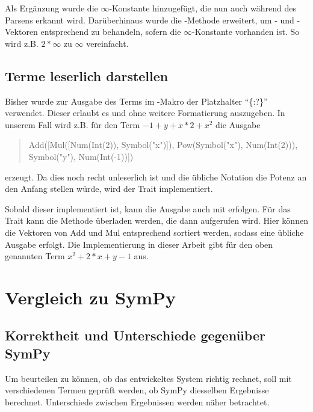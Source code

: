 \documentclass[11pt,a4paper, ngerman]{article}
\begin{document}
Als Ergänzung wurde die $\infty$-Konstante hinzugefügt, die nun auch während des Parsens erkannt wird. Darüberhinaus wurde die -Methode erweitert, um - und -Vektoren entsprechend zu behandeln, sofern die $\infty$-Konstante vorhanden ist. So wird z.B. $2*\infty$ zu $\infty$ vereinfacht.

\subsection{Terme leserlich darstellen}
Bisher wurde zur Ausgabe des Terms im -Makro der Platzhalter ``\{:?\}'' verwendet. Dieser erlaubt es  und  ohne weitere Formatierung auszugeben. In unserem Fall wird z.B. für den Term $-1+y+x*2+x^2$ die Ausgabe
\begin{quote}
    Add([Mul([Num(Int(2)), Symbol("x")]), Pow(Symbol("x"), Num(Int(2))), Symbol("y"), Num(Int(-1))])
\end{quote}
erzeugt. Da dies noch recht unleserlich ist und die übliche Notation die Potenz an den Anfang stellen würde, wird der Trait  implementiert.

Sobald dieser implementiert ist, kann die Ausgabe auch mit  erfolgen. Für das Trait kann die Methode  überladen werden, die dann aufgerufen wird. Hier können die Vektoren von Add und Mul entsprechend sortiert werden, sodass eine übliche Ausgabe erfolgt. Die Implementierung in dieser Arbeit gibt für den oben genannten Term $x^2+2*x+y-1$ aus.

\newpage

\section{Vergleich zu SymPy}
\subsection{Korrektheit und Unterschiede gegenüber SymPy}
Um beurteilen zu können, ob das entwickeltes System richtig rechnet, soll mit verschiedenen Termen geprüft werden, ob SymPy diesselben Ergebnisse berechnet. Unterschiede zwischen Ergebnissen werden näher betrachtet.
\end{document}

